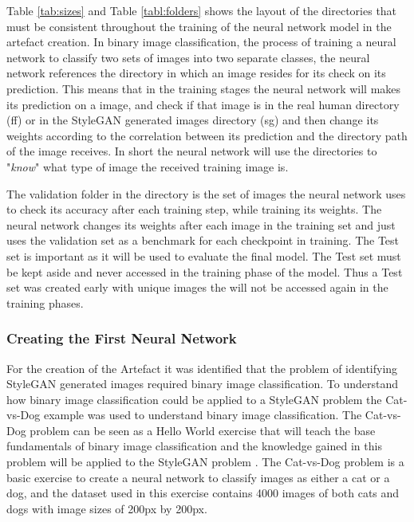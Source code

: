Table \ref{tab:sizes} and Table \ref{tabl:folders} shows the layout of the directories that must be consistent throughout the training of the neural network model in the artefact creation. In binary image classification, the process of training a neural network to classify two sets of images into two separate classes, the neural network references the directory in which an image resides for its check on its prediction. This means that in the training stages the neural network will makes its prediction on a image, and check if that image is in the real human directory (ff) or in the StyleGAN generated images directory (sg) and then change its weights according to the correlation between its prediction and the directory path of the image receives. In short the neural network will use the directories to "\textit{know}" what type of image the received training image is. 

The validation folder in the directory is the set of images the neural network uses to check its accuracy after each training step, while training its weights. The neural network changes its weights after each image in the training set and just uses the validation set as a benchmark for each checkpoint in training. The Test set is important as it will be used to evaluate the final model. The Test set must be kept aside and never accessed in the training phase of the model. Thus a Test set was created early with unique images the will not be accessed again in the training phases.

\subsubsection{Creating the First Neural Network}

For the creation of the Artefact it was identified that the problem of identifying StyleGAN generated images required binary image classification. To understand how binary image classification could be applied to a StyleGAN problem the Cat-vs-Dog example was used to understand binary image classification. The Cat-vs-Dog problem can be seen as a Hello World exercise that will teach the base fundamentals of binary image classification and the knowledge gained in this problem will be applied to the StyleGAN problem \citep{cat2014}. The Cat-vs-Dog problem is a basic exercise to create a neural network to classify images as either a cat or a dog, and the dataset used in this exercise contains 4000 images of both cats and dogs with image sizes of 200px by 200px. 

